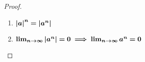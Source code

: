 \documentclass[../MathsNotesBase.tex]{subfiles}
\begin{document}
{\begin{proof}
\begin{enumerate}
{				\[ x_{n+1} = x_n \cdot x = \abs{a}^n\abs{a} < \abs{a}^n = x_n \]
				so that $x_n$ is a decreasing sequence. Additionally, ${ \forall n \in \R{} \logicsep \abs{a}^n \geq 0 }$ so 0 is a lower bound on the sequence. Therefore, the sequence converges to a limit (note we haven't yet established that 0 is the limit - only that it is a candidate). Furthermore, ${ x_{n+1} = \abs{a}^{n+1} = \abs{a}^n\abs{a} }$ and, if ${ x_n \to L }$ then ${ x_{n+1} \to L }$ also. But, putting these two facts together, along with property (d) of limits of sequences, means that,
				\[ L = \lim_{n \to \infty} \abs{a}^{n+1} = \lim_{n \to \infty} \abs{a}^n\abs{a} = (\lim_{n \to \infty} \abs{a}^n)(\lim_{n \to \infty} \abs{a}) = \abs{a}(\lim_{n \to \infty} \abs{a}^n) = \abs{a}L. \]
				So,
				\[ L = \abs{a}L \iff L(1 - \abs{a}) = 0 \]
				and, since we know that ${ \abs{a} \neq 1 }$, therefore $L$ must be 0.
			}
			
			\item{${\bm{ \left\lvert a\right\rvert^n = \left\lvert a^n\right\rvert }}$}\label{geom_prog_common_ratio_less_than_one_tends_to_zero_2}
			
			\item{${\bm{ \lim_{n \to \infty} \left\lvert a^n\right\rvert = 0 \implies \lim_{n \to \infty} a^n = 0 }}$}
			\end{enumerate}
								

\end{proof}}
\end{document}

